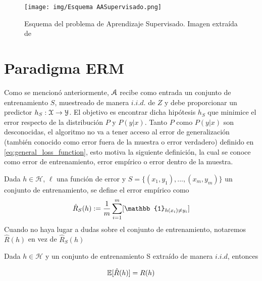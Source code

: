     \begin{figure}[htpb]
        \centering
        \texttt{[image: img/Esquema AASupervisado.png]}
        \caption{Esquema del problema de Aprendizaje Supervisado. Imagen extraída de \cite{data}}
        \label{fig:EsquemaAASupervisado}
    \end{figure}
    

\section{Paradigma ERM}


    
        
        Como se mencionó anteriormente, $\mathcal{A}$ recibe como entrada un conjunto de entrenamiento $S$, muestreado de manera $i.i.d.$ de $Z$ y debe proporcionar un predictor $h_S:\mathcal{X} \to \mathcal{Y}$. El objetivo es encontrar dicha hipótesis $h_S$ que minimice el error respecto de la distribución $P$ y $P(y|x)$. Tanto $P$ como $P(y|x)$ son desconocidas, el algoritmo no va a tener acceso al error de generalización (también conocido como error fuera de la muestra o error verdadero) definido en \eqref{eq:general_loss_function}, esto motiva la siguiente definición, la cual se conoce como error de entrenamiento, error empírico o error dentro de la muestra.
    
        
            \begin{definicion}
                Dada $h\in \mathcal{H}$, $\ell$ una función de error y  ${S=\{(x_1,y_1),...,(x_m,y_m)\}}$ un conjunto de entrenamiento, se define el error empírico como 
                \begin{equation}
                \Rh_{S}(h) := \frac{1}{m} \sum_{i=1}^m [\mathbb{1}_{h(x_i) \not= y_i}]
                \end{equation}
                \noindent Cuando no haya lugar a dudas sobre el conjunto de entrenamiento, notaremos $\hat{R}(h)$ en vez de $\hat{R}_S(h)$
            \end{definicion}
            
            
        \begin{proposicion}\label{prop:esperanza del error empirico}
            Dada $h \in \mathcal{H}$ y un  conjunto de entrenamiento S extraído de manera $i.i.d$, entonces
            
            \begin{equation}
                \mathbb{E}[\hat{R}(h)] = R(h)
            \end{equation}
            \end{proposicion}
            
